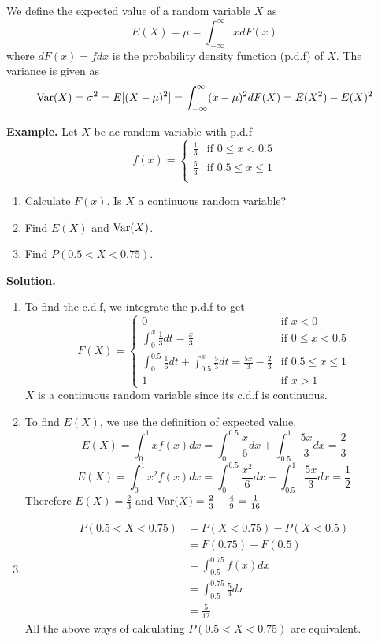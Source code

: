 \documentclass[openany]{report}
\begin{document}
\begin{definition}
    We define the expected value of a random variable $X$ as
    \[E(X) = \mu = \int_{-\infty}^\infty xdF(x)\]
    where $dF(x) = fdx$ is the probability density function (p.d.f) of $X$. The variance is given as 
    \[\operatorname{Var}(X) = \sigma^2 = E[(X - \mu)^2] = \int_{-\infty}^\infty (x - \mu)^2dF(X) = E(X^2) - E(X)^2\]
\end{definition}
\noindent
\textbf{Example.} Let $X$ be ae random variable with p.d.f 
\[f(x) = \begin{cases}
    \frac{1}{3} & \text{if } 0 \leq x < 0.5\\
    \frac{5}{3} & \text{if } 0.5 \leq x \leq 1\\
\end{cases}\]
\begin{enumerate}[label=(\roman*)]
    \item Calculate $F(x)$. Is $X$ a continuous random variable?
    \item Find $E(X)$ and $\operatorname{Var}(X)$. 
    \item Find $P(0.5 < X < 0.75)$.
\end{enumerate}
\textbf{Solution.}
\begin{enumerate}[label=(\roman*)]
    \item To find the c.d.f, we integrate the p.d.f to get 
    \[F(X) = \begin{cases}
        0 & \text{if } x < 0\\
        \int_0^x \frac{1}{3}dt =\frac{x}{3} & \text{if } 0 \leq x < 0.5\\
        \int_{0}^{0.5} \frac{1}{6}dt + \int_{0.5}^x \frac{5}{3}dt = \frac{5x}{3} - \frac{2}{3} & \text{if } 0.5 \leq x \leq 1\\
        1 & \text{if } x > 1
    \end{cases}\]
    $X$ is a continuous random variable since its c.d.f is continuous. 
    \item To find $E(X)$, we use the definition of expected value,
    \[E(X) = \int_0^1 xf(x)dx = \int_0^{0.5} \frac{x}{6}dx + \int_{0.5}^1 \frac{5x}{3}dx = \frac{2}{3}\]
    \[E(X) = \int_0^1 x^2f(x)dx = \int_0^{0.5} \frac{x^2}{6}dx + \int_{0.5}^1 \frac{5x}{3}dx = \frac{1}{2}\]
    Therefore $E(X) = \frac{2}{3}$ and $\operatorname{Var}(X) = \frac{2}{3} - \frac{4}{9} = \frac{1}{16}$
    \item
    \begin{align*}
        P(0.5 < X < 0.75) &= P(X < 0.75) - P(X < 0.5)\\
        &= F(0.75) - F(0.5)\\
         &= \int_{0.5}^{0.75} f(x)dx\\
         &= \int_{0.5}^{0.75} \frac{5}{3}dx\\
         &= \frac{5}{12}  
    \end{align*}
    All the above ways of calculating $P(0.5 < X < 0.75)$ are equivalent.
\end{enumerate}
\end{document}
